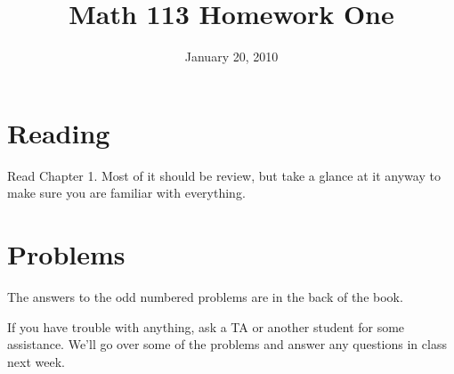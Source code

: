 \documentclass[fleqn,addpoints]{exam}
\title{Math 113 Homework One}
\author{}
\date{January 20, 2010}
\begin{document}
\maketitle

\section{Reading}

Read Chapter 1.  Most of it should be review, but take a glance at it anyway to make sure you are familiar with
everything.  

\section{Problems}

The answers to the odd numbered problems are in the back of the book.

If you have trouble with anything, ask a TA or another student for some assistance.  We'll go over some of the problems
and answer any questions in class next week. 
\end{document}
